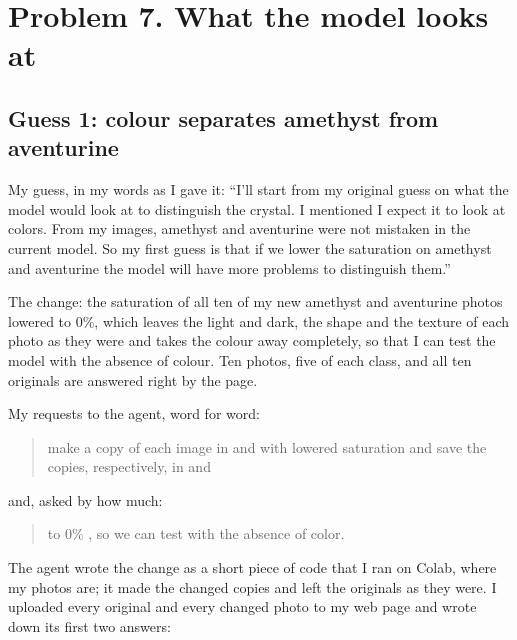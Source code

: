 \documentclass[11pt]{article}
\begin{document}
\section*{Problem 7. What the model looks at}

\subsection*{Guess 1: colour separates amethyst from aventurine}

My guess, in my words as I gave it: ``I'll start from my original guess on what
the model would look at to distinguish the crystal. I mentioned I expect it to
look at colors. From my images, amethyst and aventurine were not mistaken in the
current model. So my first guess is that if we lower the saturation on amethyst
and aventurine the model will have more problems to distinguish them.''

The change: the saturation of all ten of my new amethyst and aventurine photos
lowered to 0\%, which leaves the light and dark, the shape and the texture of
each photo as they were and takes the colour away completely, so that I can
test the model with the absence of colour. Ten photos, five of each class, and
all ten originals are answered right by the page.

My requests to the agent, word for word:
\begin{quote}
make a copy of each image in  and
 with lowered saturation and save the copies,
respectively, in  and
\end{quote}
and, asked by how much:
\begin{quote}
to 0\% , so we can test with the absence of color.
\end{quote}

The agent wrote the change as a short piece of code that I ran on Colab, where
my photos are; it made the changed copies and left the originals as they were. I
uploaded every original and every changed photo to my web page and wrote down its
first two answers:
\end{document}
